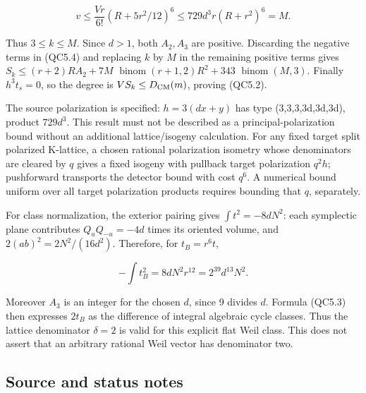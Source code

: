 \[
 v\le\frac{Vr}{6!}(R+5r^2/12)^6
    \le729d^3r(R+r^2)^6=M.
\]

Thus \(3\le k\le M\). Since \(d>1\), both \(A_{2},A_{3}\) are positive.
Discarding the negative terms in (QC5.4) and replacing \(k\) by \(M\) in
the remaining positive terms gives \(S_k\le (r+2)RA_{2}+7M\)
\(\operatorname{binom}(r+1,2)R^{2}+343\) \(\operatorname{binom}(M,3)\).
Finally \(h^{3}t_s=0\), so the degree is \(VS_k\le D_{\rm CM}(m)\),
proving (QC5.2).

The source polarization is specified: \(h=3(dx+y)\) has type
(3,3,3,3d,3d,3d), product \(729d^{3}\). This result must not be
described as a principal-polarization bound without an additional
lattice/isogeny calculation. For any fixed target split polarized
K-lattice, a chosen rational polarization isometry whose denominators
are cleared by \(q\) gives a fixed isogeny with pullback target
polarization \(q^{2}h\); pushforward transports the detector bound with
cost \(q^{6}\). A numerical bound uniform over all target polarization
products requires bounding that \(q\), separately.

For class normalization, the exterior pairing gives
\(\int t^{2}=-8dN^{2}\): each symplectic plane contributes
\(Q_uQ_{-u}=-4d\) times its oriented volume, and
\(2(ab)^{2}=2N^{2}/(16d^{2})\). Therefore, for \(t_B=r^{6}t\),

\[
 -\int t_B^2=8dN^2r^{12}=2^{39}d^{13}N^2.
\]

Moreover \(A_{3}\) is an integer for the chosen \(d\), since 9 divides
\(d\). Formula (QC5.3) then expresses \(2t_B\) as the difference of
integral algebraic cycle classes. Thus the lattice denominator
\(\delta =2\) is valid for this explicit flat Weil class. This does not
assert that an arbitrary rational Weil vector has denominator two.

\subsection{Source and status notes}\label{source-and-status-notes}

